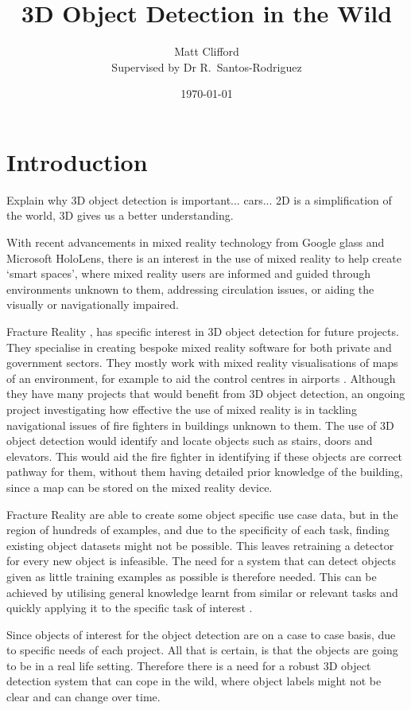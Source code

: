 \documentclass[11pt]{article}
\title{3D Object Detection in the Wild}
\author{Matt Clifford \\ Supervised by Dr R.\ Santos-Rodriguez}
\date{\today}
\begin{document}
\maketitle

\section{Introduction}
Explain why 3D object detection is important... cars... 2D is a simplification of the world, 3D gives us a better understanding.



With recent advancements in mixed reality technology from Google glass and Microsoft HoloLens, there is an interest in the use of mixed reality to help create `smart spaces', where mixed reality users are informed and guided through environments unknown to them, addressing circulation issues, or aiding the visually or navigationally impaired.

Fracture Reality \cite{fracture}, has specific interest in 3D object detection for future projects. They specialise in creating bespoke mixed reality software for both private and government sectors. They mostly work with mixed reality visualisations of maps of an environment, for example to aid the control centres in airports \cite{youtube}. Although they have many projects that would benefit from 3D object detection, an ongoing project investigating how effective the use of mixed reality is in tackling navigational issues of fire fighters in buildings unknown to them. The use of 3D object detection would identify and locate objects such as stairs, doors and elevators. This would aid the fire fighter in identifying if these objects are correct pathway for them, without them having detailed prior knowledge of the building, since a map can be stored on the mixed reality device.

Fracture Reality are able to create some object specific use case data, but in the region of hundreds of examples, and due to the specificity of each task, finding existing object datasets might not be possible. This leaves retraining a detector for every new object is infeasible. The need for a system that can detect objects given as little training examples as possible is therefore needed. This can be achieved by utilising general knowledge learnt from similar or relevant tasks and quickly applying it to the specific task of interest \cite{DeCAF}.

Since objects of interest for the object detection are on a case to case basis, due to specific needs of each project. All that is certain, is that the objects are going to be in a real life setting. Therefore there is a need for a robust 3D object detection system that can cope in the wild, where object labels might not be clear and can change over time.
\end{document}
